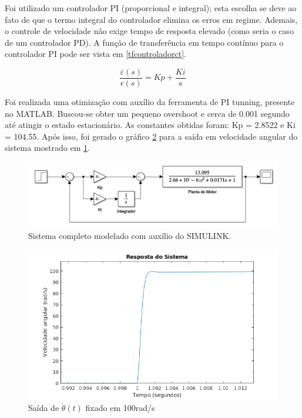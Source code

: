 \documentclass[a4paper,11pt]{article}
\begin{document}
		\newpage
		
		Foi utilizado um controlador PI (proporcional e integral); esta escolha se deve ao fato de que o termo integral do controlador elimina os erros em regime. Ademais, o controle de velocidade não exige tempo de resposta elevado (como seria o caso de um controlador PD). A função de transferência em tempo contínuo para o controlador PI pode ser vista em \ref{tfcontroladorct}.
		
		\begin{equation}
			\frac{\varepsilon(s)}{\epsilon(s)}= Kp + \frac{Ki}{s} \label{tfcontroladorct}
		\end{equation}
		
		Foi realizada uma otimização com auxílio da ferramenta de PI tunning, presente no MATLAB. Buscou-se obter um pequeno overshoot e cerca de 0.001 segundo até atingir o estado estacionário. As constantes obtidas foram: Kp = 2.8522 e Ki = 104.55. Após isso, foi gerado o gráfico \ref{fig:saidasimulada} para a saída em velocidade angular do sistema mostrado em \ref{fig:sistemasimulink}.
		
		\begin{figure}[ht]
			\centering
			\includegraphics[width=0.9\linewidth]{images/sistemaEControlador}
			\caption{Sistema completo modelado com auxílio do SIMULINK\cite{MATLAB}.}
			\label{fig:sistemasimulink}
		\end{figure}
	
		\begin{figure}[ht]
			\centering
			\includegraphics[width=0.7\linewidth]{images/sistemStep}
			\caption{Saída de $\dot{\theta}(t)$ fixado em 100rad/s}
			\label{fig:saidasimulada}
		\end{figure}
		
\end{document}
